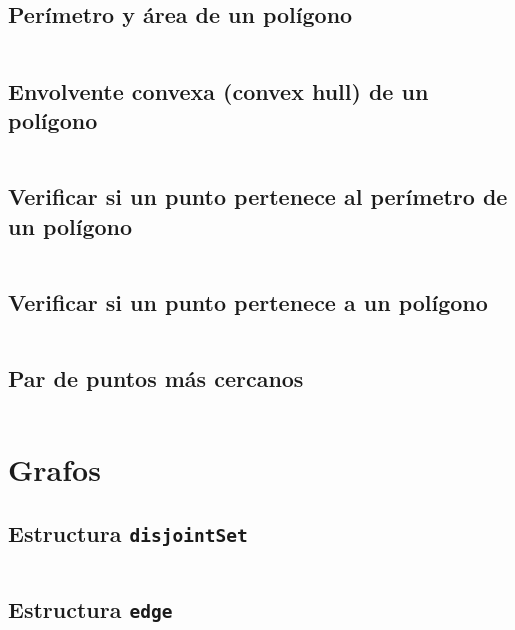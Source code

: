 \documentclass[11pt]{article}
\begin{document}
		\subsection{Perímetro y área de un polígono}
		\inputminted[tabsize=2,breaklines,firstline=174,lastline=190,fontsize=\small]{c++}{geometry.cpp}
		
		\subsection{Envolvente convexa (convex hull) de un polígono}
		\inputminted[tabsize=2,breaklines,firstline=192,lastline=211,fontsize=\small]{c++}{geometry.cpp}
		
		\subsection{Verificar si un punto pertenece al perímetro de un polígono}
		\inputminted[tabsize=2,breaklines,firstline=213,lastline=221,fontsize=\small]{c++}{geometry.cpp}
		
		\subsection{Verificar si un punto pertenece a un polígono}
		\inputminted[tabsize=2,breaklines,firstline=223,lastline=234,fontsize=\small]{c++}{geometry.cpp}
		
		\subsection{Par de puntos más cercanos}
		\inputminted[tabsize=2,breaklines,firstline=236,lastline=262,fontsize=\small]{c++}{geometry.cpp}
		
	\newpage
	\section{Grafos}
		\subsection{Estructura \texttt{disjointSet}}
		\inputminted[tabsize=2,breaklines,firstline=6,lastline=39,fontsize=\small]{c++}{graph.cpp}
		
		\subsection{Estructura \texttt{edge}}
		\inputminted[tabsize=2,breaklines,firstline=41,lastline=64,fontsize=\small]{c++}{graph.cpp}
		
\end{document}

